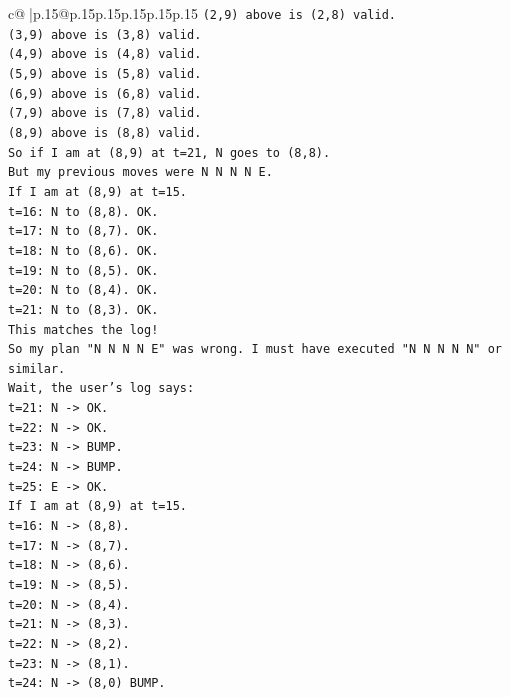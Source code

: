 \documentclass{article}
\begin{document}
{\begin{supertabular}{c@{$\;$}|p{.15\linewidth}@{}p{.15\linewidth}p{.15\linewidth}p{.15\linewidth}p{.15\linewidth}p{.15\linewidth}}
{{{\texttt{(2,9) above is (2,8) valid.} \\
\texttt{(3,9) above is (3,8) valid.} \\
\texttt{(4,9) above is (4,8) valid.} \\
\texttt{(5,9) above is (5,8) valid.} \\
\texttt{(6,9) above is (6,8) valid.} \\
\texttt{(7,9) above is (7,8) valid.} \\
\texttt{(8,9) above is (8,8) valid.} \\
\texttt{So if I am at (8,9) at t=21, N goes to (8,8).} \\
\texttt{But my previous moves were N N N N E.} \\
\texttt{If I am at (8,9) at t=15.} \\
\texttt{t=16: N to (8,8). OK.} \\
\texttt{t=17: N to (8,7). OK.} \\
\texttt{t=18: N to (8,6). OK.} \\
\texttt{t=19: N to (8,5). OK.} \\
\texttt{t=20: N to (8,4). OK.} \\
\texttt{t=21: N to (8,3). OK.} \\
\texttt{This matches the log!} \\
\texttt{So my plan "N N N N E" was wrong. I must have executed "N N N N N" or similar.} \\
\texttt{Wait, the user's log says:} \\
\texttt{t=21: N {-}> OK.} \\
\texttt{t=22: N {-}> OK.} \\
\texttt{t=23: N {-}> BUMP.} \\
\texttt{t=24: N {-}> BUMP.} \\
\texttt{t=25: E {-}> OK.} \\
\texttt{If I am at (8,9) at t=15.} \\
\texttt{t=16: N {-}> (8,8).} \\
\texttt{t=17: N {-}> (8,7).} \\
\texttt{t=18: N {-}> (8,6).} \\
\texttt{t=19: N {-}> (8,5).} \\
\texttt{t=20: N {-}> (8,4).} \\
\texttt{t=21: N {-}> (8,3).} \\
\texttt{t=22: N {-}> (8,2).} \\
\texttt{t=23: N {-}> (8,1).} \\
\texttt{t=24: N {-}> (8,0) BUMP.} \\
}}}
\end{supertabular}}
\end{document}
